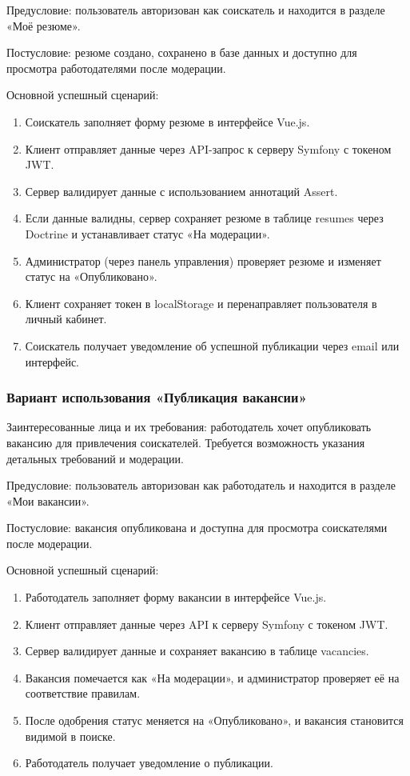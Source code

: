 Предусловие: пользователь авторизован как соискатель и находится в разделе «Моё резюме».

Постусловие: резюме создано, сохранено в базе данных и доступно для просмотра работодателями после модерации.

Основной успешный сценарий:

\begin{enumerate}
	\item Соискатель заполняет форму резюме в интерфейсе Vue.js.
	\item Клиент отправляет данные через API-запрос к серверу Symfony с токеном JWT.
	\item Сервер валидирует данные с использованием аннотаций Assert.
	\item Если данные валидны, сервер сохраняет резюме в таблице resumes через Doctrine и устанавливает статус «На модерации».
	\item Администратор (через панель управления) проверяет резюме и изменяет статус на «Опубликовано».
	\item Клиент сохраняет токен в localStorage и перенаправляет пользователя в личный кабинет.
	\item Соискатель получает уведомление об успешной публикации через email или интерфейс.
\end{enumerate}

\subsubsection{Вариант использования «Публикация вакансии»}
Заинтересованные лица и их требования: работодатель хочет опубликовать вакансию для привлечения соискателей. Требуется возможность указания детальных требований и модерации.

Предусловие: пользователь авторизован как работодатель и находится в разделе «Мои вакансии».

Постусловие: вакансия опубликована и доступна для просмотра соискателями после модерации.

Основной успешный сценарий:

\begin{enumerate}
	\item Работодатель заполняет форму вакансии в интерфейсе Vue.js.
	\item Клиент отправляет данные через API к серверу Symfony с токеном JWT.
	\item Сервер валидирует данные и сохраняет вакансию в таблице vacancies.
	\item Вакансия помечается как «На модерации», и администратор проверяет её на соответствие правилам.
	\item После одобрения статус меняется на «Опубликовано», и вакансия становится видимой в поиске.
	\item Работодатель получает уведомление о публикации.
\end{enumerate}

